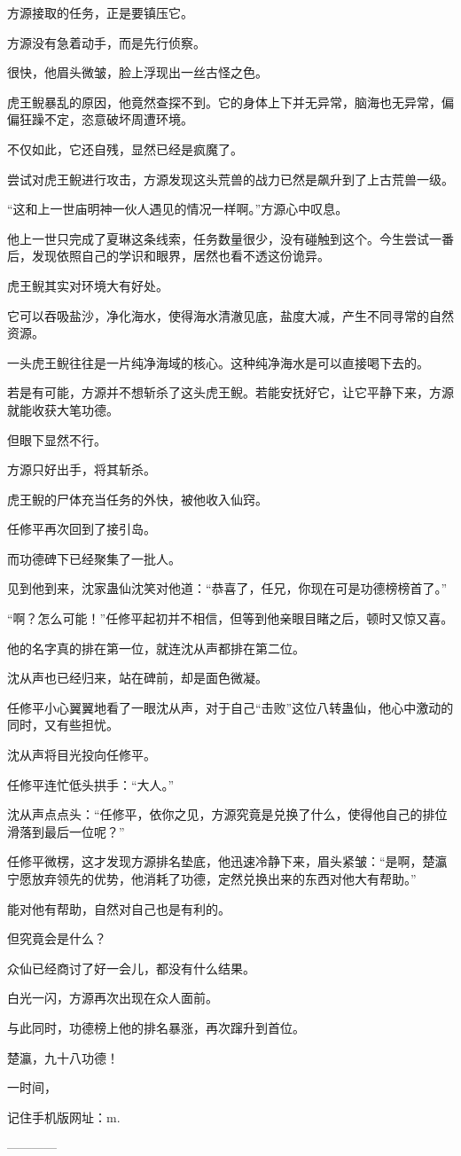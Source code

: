 \begin{this_body}
方源接取的任务，正是要镇压它。

方源没有急着动手，而是先行侦察。

很快，他眉头微皱，脸上浮现出一丝古怪之色。

虎王鲵暴乱的原因，他竟然查探不到。它的身体上下并无异常，脑海也无异常，偏偏狂躁不定，恣意破坏周遭环境。

不仅如此，它还自残，显然已经是疯魔了。

尝试对虎王鲵进行攻击，方源发现这头荒兽的战力已然是飙升到了上古荒兽一级。

“这和上一世庙明神一伙人遇见的情况一样啊。”方源心中叹息。

他上一世只完成了夏琳这条线索，任务数量很少，没有碰触到这个。今生尝试一番后，发现依照自己的学识和眼界，居然也看不透这份诡异。

虎王鲵其实对环境大有好处。

它可以吞吸盐沙，净化海水，使得海水清澈见底，盐度大减，产生不同寻常的自然资源。

一头虎王鲵往往是一片纯净海域的核心。这种纯净海水是可以直接喝下去的。

若是有可能，方源并不想斩杀了这头虎王鲵。若能安抚好它，让它平静下来，方源就能收获大笔功德。

但眼下显然不行。

方源只好出手，将其斩杀。

虎王鲵的尸体充当任务的外快，被他收入仙窍。

任修平再次回到了接引岛。

而功德碑下已经聚集了一批人。

见到他到来，沈家蛊仙沈笑对他道：“恭喜了，任兄，你现在可是功德榜榜首了。”

“啊？怎么可能！”任修平起初并不相信，但等到他亲眼目睹之后，顿时又惊又喜。

他的名字真的排在第一位，就连沈从声都排在第二位。

沈从声也已经归来，站在碑前，却是面色微凝。

任修平小心翼翼地看了一眼沈从声，对于自己“击败”这位八转蛊仙，他心中激动的同时，又有些担忧。

沈从声将目光投向任修平。

任修平连忙低头拱手：“大人。”

沈从声点点头：“任修平，依你之见，方源究竟是兑换了什么，使得他自己的排位滑落到最后一位呢？”

任修平微楞，这才发现方源排名垫底，他迅速冷静下来，眉头紧皱：“是啊，楚瀛宁愿放弃领先的优势，他消耗了功德，定然兑换出来的东西对他大有帮助。”

能对他有帮助，自然对自己也是有利的。

但究竟会是什么？

众仙已经商讨了好一会儿，都没有什么结果。

白光一闪，方源再次出现在众人面前。

与此同时，功德榜上他的排名暴涨，再次蹿升到首位。

楚瀛，九十八功德！

一时间，

记住手机版网址：m.

------------

\end{this_body}


